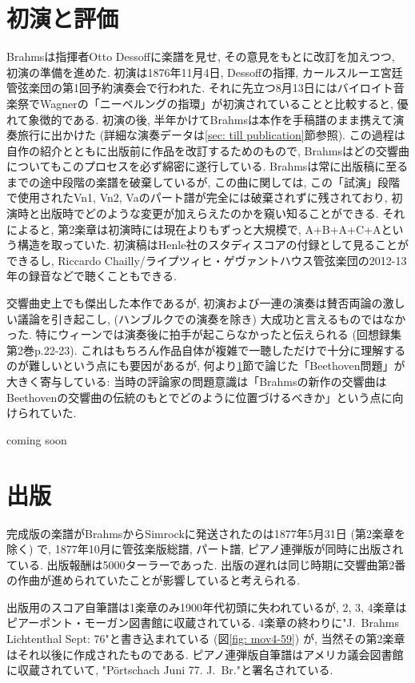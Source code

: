 \section{初演と評価}\label{sec: premiere}

Brahmsは指揮者Otto Dessoffに楽譜を見せ, その意見をもとに改訂を加えつつ, 初演の準備を進めた.
初演は1876年11月4日, Dessoffの指揮, カールスルーエ宮廷管弦楽団の第1回予約演奏会で行われた.
それに先立つ8月13日にはバイロイト音楽祭でWagnerの「ニーベルングの指環」が初演されていることと比較すると, 優れて象徴的である.
初演の後, 半年かけてBrahmsは本作を手稿譜のまま携えて演奏旅行に出かけた (詳細な演奏データは\ref{sec: till publication}節参照).
この過程は自作の紹介とともに出版前に作品を改訂するためのもので, Brahmsはどの交響曲についてもこのプロセスを必ず綿密に遂行している.
Brahmsは常に出版稿に至るまでの途中段階の楽譜を破棄しているが, この曲に関しては,
この「試演」段階で使用されたVn1, Vn2, Vaのパート譜が完全には破棄されずに残されており, 初演時と出版時でどのような変更が加えらえたのかを窺い知ることができる.
それによると, 第2楽章は初演時には現在よりもずっと大規模で, A+B+A+C+Aという構造を取っていた.
初演稿はHenle社のスタディスコアの付録として見ることができる\cite{henle}し, Riccardo Chailly/ライプツィヒ・ゲヴァントハウス管弦楽団の2012-13年の録音などで聴くこともできる.

交響曲史上でも傑出した本作であるが, 初演および一連の演奏は賛否両論の激しい議論を引き起こし, (ハンブルクでの演奏を除き) 大成功と言えるものではなかった\cite{compos}.
特にウィーンでは演奏後に拍手が起こらなかったと伝えられる (回想録集\cite{kaisouroku}第2巻p.22-23).
これはもちろん作品自体が複雑で一聴しただけで十分に理解するのが難しいという点にも要因があるが, 何より\ref{sec: premiere}節で論じた「Beethoven問題」が大きく寄与している:
当時の評論家の問題意識は「Brahmsの新作の交響曲はBeethovenの交響曲の伝統のもとでどのように位置づけるべきか」という点に向けられていた\cite{frisch}.

coming soon


\section{出版}

完成版の楽譜がBrahmsからSimrockに発送されたのは1877年5月31日 (第2楽章を除く) で\cite{library},
1877年10月に管弦楽版総譜, パート譜, ピアノ連弾版が同時に出版されている\cite{frisch}. 出版報酬は5000ターラーであった\cite{henle}.
出版の遅れは同じ時期に交響曲第2番の作曲が進められていたことが影響していると考えられる.

出版用のスコア自筆譜は1楽章のみ1900年代初頭に失われているが, 2, 3, 4楽章はピアーポント・モーガン図書館に収蔵されている.
4楽章の終わりに"J.~Brahms Lichtenthal Sept: 76"と書き込まれている (図\ref{fig: mov4-59}) が, 当然その第2楽章はそれ以後に作成されたものである.
ピアノ連弾版自筆譜はアメリカ議会図書館に収蔵されていて, "Pörtschach Juni 77. J.~Br."と署名されている\cite{frisch}.

